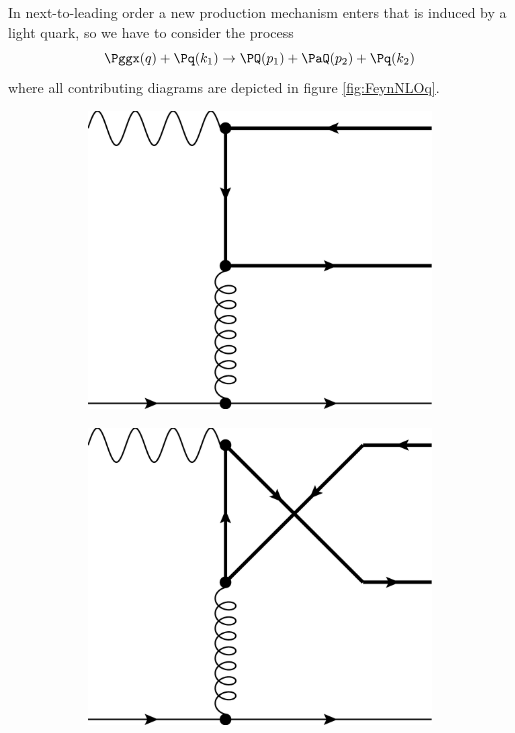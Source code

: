 In next-to-leading order a new production mechanism enters that is induced by a light quark, so we have to consider the process
\begin{equation}
\Pggx(q) + \Pq(k_1) \rightarrow \PQ(p_1)+\PaQ(p_2) + \Pq(k_2)
\end{equation}
where all contributing diagrams are depicted in figure \ref{fig:FeynNLOq}.
\begin{figure}[ht!]
\centering
\begin{subfigure}[t]{.23\textwidth}
	\includegraphics[width=\textwidth]{pyfeyn/nlo-q-1}
	\caption{}
\end{subfigure}\hspace{.02\textwidth}%
\begin{subfigure}[t]{.23\textwidth}
	\includegraphics[width=\textwidth]{pyfeyn/nlo-q-2}

\end{subfigure}
\end{figure}
